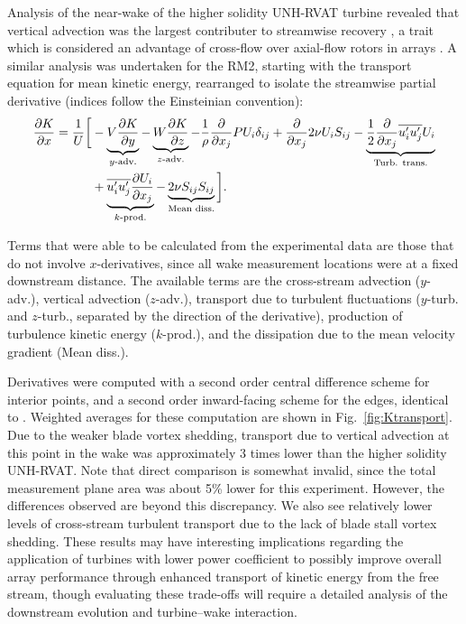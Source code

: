 \documentclass[10pt,letterpaper]{article}
\def \p{\partial}
\begin{document}
Analysis of the near-wake of the higher solidity UNH-RVAT turbine revealed that
vertical advection was the largest contributer to streamwise recovery
\cite{Bachant2015-JoT}, a trait which is considered an advantage of cross-flow
over axial-flow rotors in arrays \cite{Kinzel2012}. A similar analysis was
undertaken for the RM2, starting with the transport equation for mean kinetic
energy, rearranged to isolate the streamwise partial derivative (indices follow
the Einsteinian convention):
\begin{equation}
    \begin{split}
        \frac{\p K}{\p x}
        =
        \frac{1}{U}
        \bigg{[}
        & - \underbrace{V \frac{\p K}{\p y}}_{y\text{-adv.}}
        - \underbrace{W \frac{\p K}{\p z}}_{z\text{-adv.}}
        - \frac{1}{\rho}\frac{\p}{\p x_j} P U_i \delta_{ij}
        + \frac{\p}{\p x_j} 2 \nu U_i S_{ij}
        - \underbrace{
            \frac{1}{2}\frac{\p}{\p x_j} \overline{u_i' u_j'} U_i
        }_{\text{Turb. trans.}} \\
        & + 
        \underbrace{
            \overline{u_i' u_j'} \frac{\p U_i}{\p x_j}
        }_{k\text{-prod.}}
        - 
        \underbrace{
            2 \nu S_{ij}S_{ij}
        }_{\text{Mean diss.}}
        \bigg{]}.
    \end{split}
    \label{eq:K-full}
\end{equation}

Terms that were able to be calculated from the experimental data are those that
do not involve $x$-derivatives, since all wake measurement locations were at a
fixed downstream distance. The available terms are the cross-stream advection
($y$-adv.), vertical advection ($z$-adv.), transport due to turbulent
fluctuations ($y$-turb. and $z$-turb., separated by the direction of the
derivative), production of turbulence kinetic energy ($k$-prod.), and the
dissipation due to the mean velocity gradient (Mean diss.).

Derivatives were computed with a second order central difference scheme for
interior points, and a second order inward-facing scheme for the edges,
identical to \cite{Bachant2015-JoT}. Weighted averages for these computation are
shown in Fig.~\ref{fig:Ktransport}. Due to the weaker blade vortex shedding,
transport due to vertical advection at this point in the wake was approximately
3 times lower than the higher solidity UNH-RVAT. Note that direct comparison is
somewhat invalid, since the total measurement plane area was about 5\% lower for
this experiment. However, the differences observed are beyond this discrepancy.
We also see relatively lower levels of cross-stream turbulent transport due to
the lack of blade stall vortex shedding. These results may have interesting
implications regarding the application of turbines with lower power coefficient
to possibly improve overall array performance through enhanced transport of
kinetic energy from the free stream, though evaluating these trade-offs will
require a detailed analysis of the downstream evolution and turbine--wake
interaction.
\end{document}
